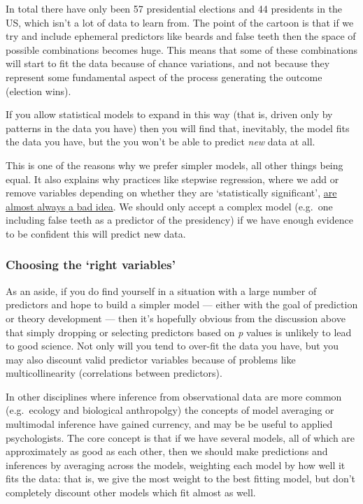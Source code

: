 \documentclass[]{article}
\begin{document}
In total there have only been 57 presidential elections and 44 presidents in the
US, which isn't a lot of data to learn from. The point of the cartoon is that if
we try and include ephemeral predictors like beards and false teeth then the
space of possible combinations becomes huge. This means that some of these
combinations will start to fit the data because of chance variations, and not
because they represent some fundamental aspect of the process generating the
outcome (election wins).

If you allow statistical models to expand in this way (that is, driven only by
patterns in the data you have) then you will find that, inevitably, the model
fits the data you have, but the you won't be able to predict \emph{new} data at all.

This is one of the reasons why we prefer simpler models, all other things being
equal. It also explains why practices like stepwise regression, where we add or
remove variables depending on whether they are `statistically significant',
\href{http://www.stata.com/support/faqs/statistics/stepwise-regression-problems/}{are almost always a bad idea}.
We should only accept a complex model (e.g.~one including false teeth as a
predictor of the presidency) if we have enough evidence to be confident this
will predict new data.

\hypertarget{variable-selection}{%
\subsubsection*{Choosing the `right variables'}\label{variable-selection}}

As an aside, if you do find yourself in a situation with a large number of
predictors and hope to build a simpler model --- either with the goal of
prediction or theory development --- then it's hopefully obvious from the
discussion above that simply dropping or selecting predictors based on \emph{p}
values is unlikely to lead to good science. Not only will you tend to over-fit
the data you have, but you may also discount valid predictor variables because
of problems like multicollinearity (correlations between predictors).

In other disciplines where inference from observational data are more common
(e.g.~ecology and biological anthropolgy) the concepts of model averaging or
multimodal inference have gained currency, and may be be useful to applied
psychologists. The core concept is that if we have several models, all of which
are approximately as good as each other, then we should make predictions and
inferences by averaging across the models, weighting each model by how well it
fits the data: that is, we give the most weight to the best fitting model, but
don't completely discount other models which fit almost as well.
\end{document}
